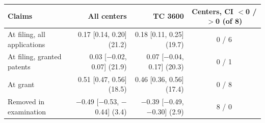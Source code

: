 \begin{tabular}{lrrc}
\toprule
Claims & All centers & TC 3600 & Centers, CI $<$0 / $>$0 (of 8) \\
\midrule
At filing, all applications & 0.17 [0.14, 0.20] (21.2) & 0.18 [0.11, 0.25] (19.7) & 0 / 6 \\
At filing, granted patents & 0.03 [$-$0.02, 0.07] (21.9) & 0.07 [$-$0.04, 0.17] (20.3) & 0 / 1 \\
At grant & 0.51 [0.47, 0.56] (18.5) & 0.46 [0.36, 0.56] (17.4) & 0 / 8 \\
Removed in examination & $-$0.49 [$-$0.53, $-$0.44] (3.4) & $-$0.39 [$-$0.49, $-$0.30] (2.9) & 8 / 0 \\
\bottomrule
\end{tabular}
